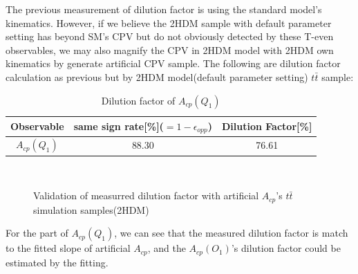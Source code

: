 			The previous measurement of dilution factor is using the standard model's kinematics. However, if we believe the 2HDM sample with default parameter setting has beyond SM's CPV but do not obviously detected by these T-even observables, we may also magnify the CPV in 2HDM model with 2HDM own kinematics by generate artificial CPV sample. The following are dilution factor calculation as previous but by 2HDM model(default parameter setting) $t\bar{t}$ sample:

			\begin{center}
			\setlength{\tabcolsep}{12pt}
			\begin{longtable}{ c | c c }
			\caption{Dilution factor of $A_{cp}(Q_1)$}\\
			\hline
			Observable & same sign rate[\%]($=1-\epsilon_{opp}$) & Dilution Factor[\%] \\
			\hline
			$A_{cp}(Q_1)$ & 88.30  &  76.61  \\
			\hline
			\end{longtable}
			\label{Obs:tb:2HDM_DF}
			\end{center}

			\begin{figure}[H]
			\centering
			    \\
			\caption{Validation of measurred dilution factor with artificial $A_{cp}$'s $t\bar{t}$ simulation samples(2HDM)}
			\label{Obs:fig:vali_2HDM}
			\end{figure}
			\FloatBarrier

			For the part of $A_{cp}(Q_1)$, we can see that the measured dilution factor is match to the fitted slope of artificial $A_{cp}$, and the $A_{cp}(O_1)$'s dilution factor could be estimated by the fitting.

\FloatBarrier
